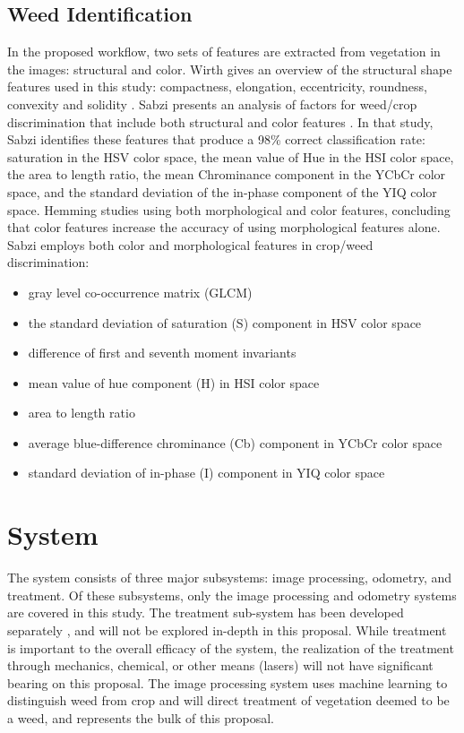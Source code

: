 \documentclass[letterpaper]{article}
\begin{document}
{{\subsection{Weed Identification}
In the proposed workflow, two sets of features are extracted from vegetation in the images: structural and color. Wirth gives an overview of the structural shape features used in this study: compactness, elongation, eccentricity, roundness, convexity and solidity \cite{Wirth2004-li}. 
Sabzi presents an analysis of factors for weed/crop discrimination that include both structural and color features \cite{Sabzi2020-af}. In that study, Sabzi identifies these features that produce a 98\% correct classification rate: saturation in the HSV \cite{Various_undated-yv} color space, the mean value of Hue in the HSI color space, the area to length ratio, the mean Chrominance component in the YCbCr \cite{Wikipedia_contributors2022-qd} color space, and the standard deviation of the in-phase component of the YIQ \cite{Various_undated-cz} color space.
Hemming studies using both morphological and color features, concluding that color features increase the accuracy of using morphological features alone. \cite{Hemming2001-ue} \\

Sabzi \cite{Sabzi2020-af} employs both color and morphological features in crop/weed discrimination:
\begin{itemize}
	\item{gray level co-occurrence matrix (GLCM)}
	\item{the standard deviation of saturation (S) component in HSV color space}
	\item{difference of first and seventh moment invariants}
	\item{mean value of hue component (H) in HSI color space} 
	\item{area to length ratio}
	\item{average blue-difference chrominance (Cb) component in YCbCr color space}
	\item{standard deviation of in-phase (I) component in YIQ color space}
\end{itemize}


\newpage
 
\section{System}
\label{section:system}

The system consists of three major subsystems: image processing, odometry, and treatment. Of these subsystems, only the image processing and odometry systems are covered in this study. The treatment sub-system has been developed separately \cite{Siemens2020-ds}, and will not be explored in-depth in this proposal. While treatment is important to the overall efficacy of the system, the realization of the treatment through mechanics, chemical, or other means (lasers) will not have significant bearing on this proposal. The image processing system uses machine learning to distinguish weed from crop and will direct treatment of vegetation deemed to be a weed, and represents the bulk of this proposal. 

}}
\end{document}
